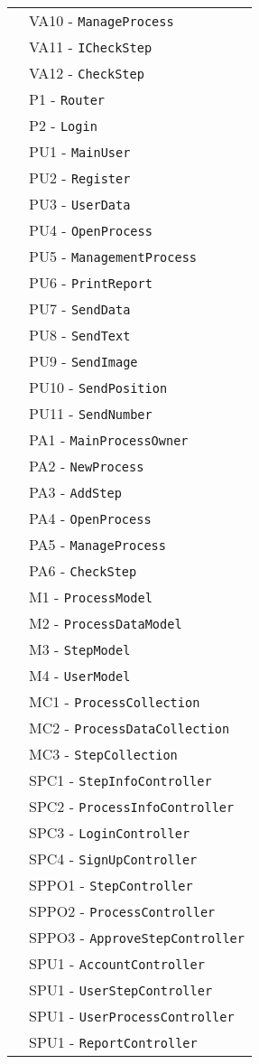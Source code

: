 \begin{longtable}{XX}
&VA10 - \texttt{ManageProcess}\\ 
&VA11 - \texttt{ICheckStep}\\ 
&VA12 - \texttt{CheckStep}\\ 
\midrule
\logic{} &P1 - \texttt{Router}\\ 
&P2 - \texttt{Login}\\ 
\logicUser{}&PU1 - \texttt{MainUser}\\ 
&PU2 - \texttt{Register}\\ 
&PU3 - \texttt{UserData}\\ 
&PU4 - \texttt{OpenProcess}\\ 
&PU5 - \texttt{ManagementProcess}\\ 
&PU6 - \texttt{PrintReport}\\ 
&PU7 - \texttt{SendData}\\ 
&PU8 - \texttt{SendText}\\ 
&PU9 - \texttt{SendImage}\\ 
&PU10 - \texttt{SendPosition}\\ 
&PU11 - \texttt{SendNumber}\\ 
\midrule
\logicAdmin{}&PA1 - \texttt{MainProcessOwner}\\
&PA2 - \texttt{NewProcess}\\ 
&PA3 - \texttt{AddStep}\\ 
&PA4 - \texttt{OpenProcess}\\ 
&PA5 - \texttt{ManageProcess}\\ 
&PA6 - \texttt{CheckStep}\\ 
\midrule
\model{}&M1 - \texttt{ProcessModel}\\
&M2 - \texttt{ProcessDataModel}\\
&M3 - \texttt{StepModel}\\
&M4 - \texttt{UserModel}\\
\midrule
\collection{}&MC1 - \texttt{{ProcessCollection}}\\
&MC2 - \texttt{{ProcessDataCollection}}\\
&MC3 - \texttt{{StepCollection}}\\
\midrule
\sCommon{}&SPC1 - \texttt{StepInfoController}\\
		&SPC2 - \texttt{ProcessInfoController}\\
		&SPC3 - \texttt{LoginController}\\
		&SPC4 - \texttt{SignUpController}\\
\midrule

\sProcessOwner{}&SPPO1 - \texttt{StepController}\\
&SPPO2 - \texttt{ProcessController}\\
&SPPO3 - \texttt{ApproveStepController}\\
\midrule
\sUser{}&SPU1 - \texttt{AccountController}\\
&SPU1 - \texttt{UserStepController}\\
&SPU1 - \texttt{UserProcessController}\\
&SPU1 - \texttt{ReportController}\\
\midrule


\end{longtable}
